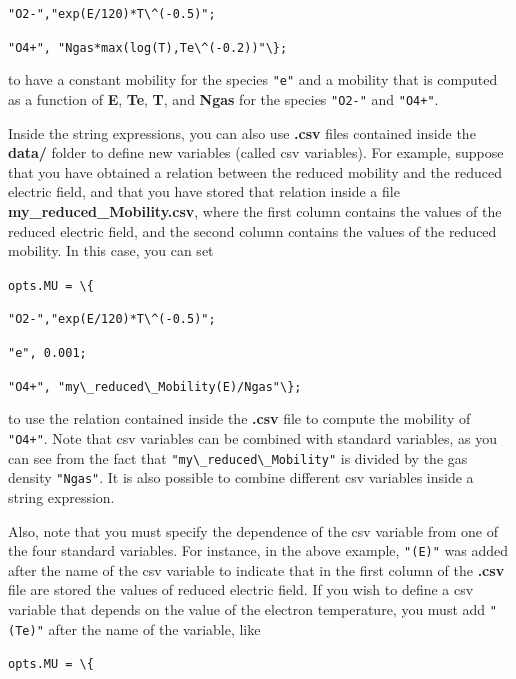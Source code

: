 \documentclass[12pt,a4paper]{article}
\newcommand{\matlabs}[1]{{\lstinline[style=MatlabStyle]!#1!}}
\begin{document}
	\hspace{40pt} \matlabs{"O2-","exp(E/120)*T\^(-0.5)";} 
		
	\hspace{40pt} \matlabs{"O4+", "Ngas*max(log(T),Te\^(-0.2))"\};}
	
	\noindent to have a constant mobility for the species \matlabs{"e"} and a mobility that is computed as a function of \textbf{E}, \textbf{Te}, \textbf{T}, and \textbf{Ngas} for the species \matlabs{"O2-"} and \matlabs{"O4+"}.
	
	Inside the string expressions, you can also use \textbf{.csv} files contained inside the \textbf{data/} folder to define new variables (called csv variables).
	For example, suppose that you have obtained a relation between the reduced mobility and the reduced electric field, and that you have stored that relation inside a file \textbf{my\_reduced\_Mobility.csv}, where the first column contains the values of the reduced electric field, and the second column contains the values of the reduced mobility. In this case, you can set
	
	\matlabs{opts.MU = \{}
	
	\hspace{40pt} \matlabs{"O2-","exp(E/120)*T\^(-0.5)";} 
	
	\hspace{40pt} \matlabs{"e", 0.001;}
	
	\hspace{40pt} \matlabs{"O4+", "my\_reduced\_Mobility(E)/Ngas"\};}
	
	\noindent to use the relation contained inside the \textbf{.csv} file to compute the mobility of \matlabs{"O4+"}. Note that csv variables can be combined with standard variables, as you can see from the fact that \matlabs{"my\_reduced\_Mobility"} is divided by the gas density \matlabs{"Ngas"}. It is also possible to combine different csv variables inside a string expression.
	
	Also, note that you must specify the dependence of the csv variable from one of the four standard variables. For instance, in the above example, \matlabs{"(E)"} was added after the name of the csv variable to indicate that in the first column of the \textbf{.csv} file are stored the values of reduced electric field. If you wish to define a csv variable that depends on the value of the electron temperature, you must add \matlabs{"(Te)"} after the name of the variable, like 
	
	\matlabs{opts.MU = \{}
	
\end{document}
